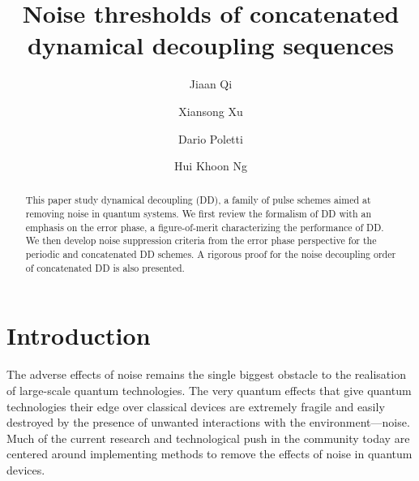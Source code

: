 \documentclass[aps,pra,reprint,superscriptaddress]{revtex4-2}
\begin{document}
\title{Noise thresholds of concatenated dynamical decoupling sequences}
\author{Jiaan Qi}

\author{Xiansong Xu}
\author{Dario Poletti}
\author{Hui Khoon Ng}


\begin{abstract}
This paper study dynamical decoupling (DD), a family of pulse schemes aimed at removing noise in quantum systems. We first review the formalism of DD with an emphasis on the error phase, a figure-of-merit characterizing the performance of DD. We then develop noise suppression criteria from the error phase perspective for the periodic and concatenated DD schemes. A rigorous proof for the noise decoupling order of  concatenated DD is also presented.
\end{abstract}

\maketitle





\section{Introduction}
The adverse eﬀects of noise remains the single biggest obstacle to the realisation of large-scale quantum technologies. The very quantum eﬀects that give quantum technologies their edge over classical devices are extremely fragile and easily destroyed by the presence of unwanted interactions with the environment—noise. Much of the current research and technological push in the community today are centered around implementing methods to remove the eﬀects of noise in quantum devices.
\end{document}
